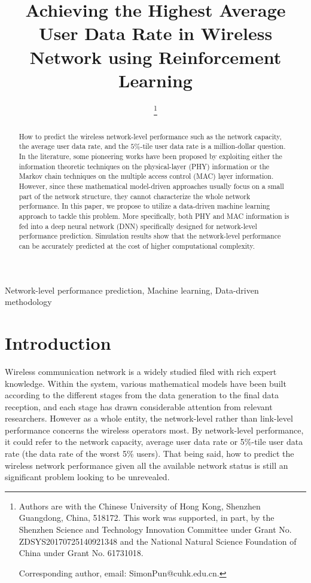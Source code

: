 \documentclass[journal]{IEEEtran}
\begin{document}
	\title{Achieving the Highest Average User Data Rate in Wireless Network using Reinforcement Learning}
	\author{
	\thanks{Authors are with the Chinese University of Hong Kong, Shenzhen	Guangdong, China, 518172. This work was supported, in part, by the Shenzhen Science and Technology Innovation Committee under Grant No. ZDSYS20170725140921348 and the National Natural Science Foundation of China under Grant No. 61731018.
		
	Corresponding author, email: SimonPun@cuhk.edu.cn.}}
	\maketitle
	
	\begin{abstract}
		How to predict the wireless network-level performance such as the network capacity, the average user data rate, and the $5\%$-tile user data rate is a million-dollar question. In the literature, some pioneering works have been proposed by exploiting either the information theoretic techniques on the physical-layer (PHY) information or the Markov chain techniques on the multiple access control (MAC) layer information. However, since these mathematical model-driven approaches usually focus on a small part of the network structure, they cannot characterize the whole network performance. In this paper, we propose to utilize a data-driven machine learning approach to tackle this problem. More specifically, both PHY and MAC information is fed into a deep neural network (DNN) specifically designed for network-level performance prediction. Simulation results show that the network-level performance can be accurately predicted at the cost of higher computational complexity.
	\end{abstract}
	
	\begin{IEEEkeywords}
		Network-level performance prediction, Machine learning, Data-driven methodology
	\end{IEEEkeywords}
	
	\section{Introduction}
	
	Wireless communication network is a widely studied filed with rich expert knowledge. Within the system, various mathematical models have been built according to the different stages from the data generation to the final data reception, and each stage has drawn considerable attention from relevant researchers. However as a whole entity, the network-level  rather than link-level performance concerns the wireless operators most. By network-level performance, it could refer to the network capacity, average user data rate or 5\%-tile user data rate (the data rate of the worst 5\% users). That being said, how to predict the wireless network performance given all the available network status is still an significant problem looking to be unrevealed.
	
\end{document}
